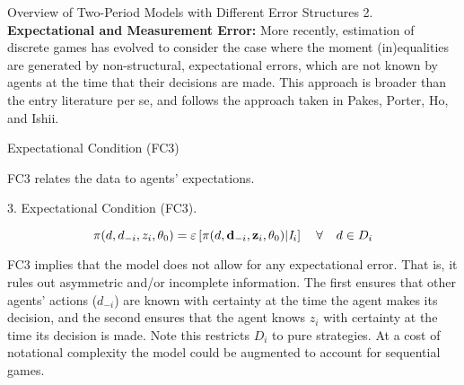 \begin{frame}{Overview of Two-Period Models with Different Error Structures}
\vspace{2mm}
2.  {\bf Expectational and Measurement Error:} More recently, estimation of discrete games has evolved to consider the case where the moment (in)equalities are generated by non-structural, expectational errors, which are not known by agents at the time that their decisions are made. This approach is broader than the entry literature per se, and follows the approach taken in Pakes, Porter, Ho, and Ishii. 
\end{frame}

\begin{frame}{Expectational Condition (FC3)}

FC3 relates the data to agents' expectations.

\vspace{0.2in}

3. Expectational Condition (FC3).

\begin{equation*}
\pi (d,d_{-i},z_{i},\theta _{0})=\varepsilon \left[ \pi (d,\mathbf{d}%
_{-i},\mathbf{z}_{i},\theta _{0})|\mathit{I}_{i}\right] \text{ \hspace{0.1in}} \forall  \text{ \hspace{0.1in}} d\in D_{i}
\end{equation*}

FC3 implies that the model does not allow for any expectational error. That
is, it rules out asymmetric and/or incomplete information. The first ensures
that other agents' actions ($d_{-i}$) are known with certainty at the time
the agent makes its decision, and the second ensures that the agent knows $%
z_{i}$ with certainty at the time its decision is made.  Note this restricts $D_i$ to pure strategies.  At a cost of
notational complexity the model could be augmented to account for sequential
games.

\end{frame}

